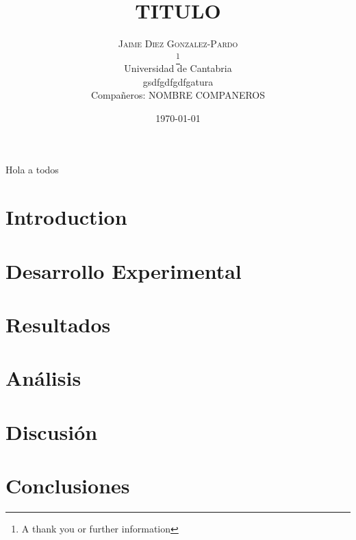 \documentclass[a4paper, 11pt, oneside]{book}
\title{
		\textbf{TITULO}%
	}
\author{
		\textsc{Jaime Diez Gonzalez-Pardo}\\

		\thanks{A thank you or further information}\\ %
		
		\fontsize{28pt}{10pt} Universidad de Cantabria \\ %
		\normalsize gsdfgdfgdfgatura \\ 
		\normalsize{Compañeros:} \textsc{NOMBRE COMPANEROS }\\%
	}
\date{\today}
\begin{document}
		\begin{titlepage}

			\LARGE Hola a todos
		\end{titlepage}



		\thispagestyle{fancy} %


				\chapter{Introduction} %
					\label{sec:Intro}

				\chapter{Desarrollo Experimental}
					
				\chapter{Resultados}

				\chapter{An\'alisis}

				\chapter{Discusión}

				\chapter{Conclusiones}


			
			

				
			\newpage

				\appendix

	
\end{document}
